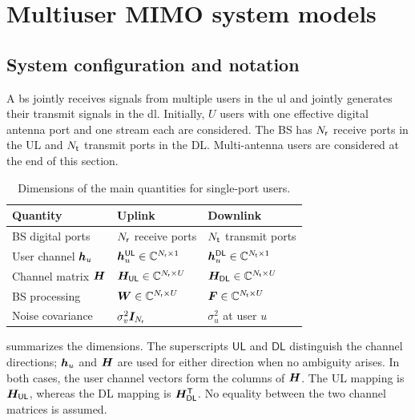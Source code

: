 \section{Multiuser MIMO system models}
\label{sec:models}

\subsection{System configuration and notation}
A \ac{bs} jointly receives signals from multiple users in the \ac{ul} and jointly generates their transmit signals in the \ac{dl}. Initially, $U$ users with one effective digital antenna port and one stream each are considered. The BS has $N_{\mathsf{r}}$ receive ports in the UL and $N_{\mathsf{t}}$ transmit ports in the DL. Multi-antenna users are considered at the end of this section.

\begin{table}[ht]
	\centering
	\small
	\caption{Dimensions of the main quantities for single-port users.}
	\label{tab:mu-dimensions}
	\begin{tabular}{lll}
		\toprule
		Quantity & Uplink & Downlink\\
		\midrule
		BS digital ports & $N_{\mathsf{r}}$ receive ports & $N_{\mathsf{t}}$ transmit ports\\
		User channel $\bm{h}_u$ & $\bm{h}_u^{\mathsf{UL}}\in\mathbb{C}^{N_{\mathsf{r}}\times1}$ & $\bm{h}_u^{\mathsf{DL}}\in\mathbb{C}^{N_{\mathsf{t}}\times1}$\\
		Channel matrix $\bm{H}$ & $\bm{H}_{\mathsf{UL}}\in\mathbb{C}^{N_{\mathsf{r}}\times U}$ & $\bm{H}_{\mathsf{DL}}\in\mathbb{C}^{N_{\mathsf{t}}\times U}$\\
		BS processing & $\bm{W}\in\mathbb{C}^{N_{\mathsf{r}}\times U}$ & $\bm{F}\in\mathbb{C}^{N_{\mathsf{t}}\times U}$\\
		Noise covariance & $\sigma_v^2\bm{I}_{N_{\mathsf{r}}}$ & $\sigma_u^2$ at user $u$\\
		\bottomrule
	\end{tabular}
\end{table}

 summarizes the dimensions. The superscripts $\mathsf{UL}$ and $\mathsf{DL}$ distinguish the channel directions; $\bm{h}_u$ and $\bm{H}$ are used for either direction when no ambiguity arises. In both cases, the user channel vectors form the columns of $\bm{H}$. The UL mapping is $\bm{H}_{\mathsf{UL}}$, whereas the DL mapping is ${\bm{H}}^{\mathsf{T}}_{\mathsf{DL}}$. No equality between the two channel matrices is assumed.

